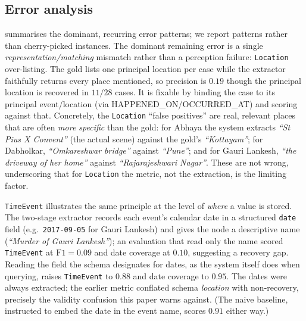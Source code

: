 \documentclass[conference]{IEEEtran}
\newcommand{\rel}[1]{\textup{\MakeUppercase{#1}}}
\newcommand{\node}[1]{\texttt{#1}}
\begin{document}
\subsection{Error analysis}
\label{sec:erroranalysis}
 summarises the dominant, recurring error patterns; we report
patterns rather than cherry-picked instances. The dominant remaining error is a
single \emph{representation/matching} mismatch rather than a perception failure:
\node{Location} over-listing. The gold lists one principal location per case while
the extractor faithfully returns every place mentioned, so precision is $0.19$
though the principal location is recovered in $11/28$ cases. It is fixable by
binding the case to its principal event/location (via
\rel{happened\_on}/\rel{occurred\_at}) and scoring against that. Concretely, the
\node{Location} ``false positives'' are real, relevant places that are often
\emph{more specific} than the gold: for Abhaya the system extracts
\emph{``St Pius X Convent''} (the actual scene) against the gold's
\emph{``Kottayam''}; for Dabholkar, \emph{``Omkareshwar bridge''} against
\emph{``Pune''}; and for Gauri Lankesh, \emph{``the driveway of her home''}
against \emph{``Rajarajeshwari Nagar''}. These are not wrong, underscoring that
for \node{Location} the metric, not the extraction, is the limiting factor.

\node{TimeEvent} illustrates the same principle at the level of \emph{where} a
value is stored. The two-stage extractor records each event's calendar date in a
structured \texttt{date} field (e.g.\ \texttt{2017-09-05} for Gauri Lankesh) and
gives the node a descriptive name (\emph{``Murder of Gauri Lankesh''}); an
evaluation that read only the name scored \node{TimeEvent} at $\mathrm{F1}=0.09$
and date coverage at $0.10$, suggesting a recovery gap. Reading the field the
schema designates for dates, as the system itself does when querying, raises
\node{TimeEvent} to $0.88$ and date coverage to $0.95$. The dates were always
extracted; the earlier metric conflated schema \emph{location} with
non-recovery, precisely the validity confusion this paper warns against. (The
naive baseline, instructed to embed the date in the event name, scores $0.91$
either way.)
\end{document}
